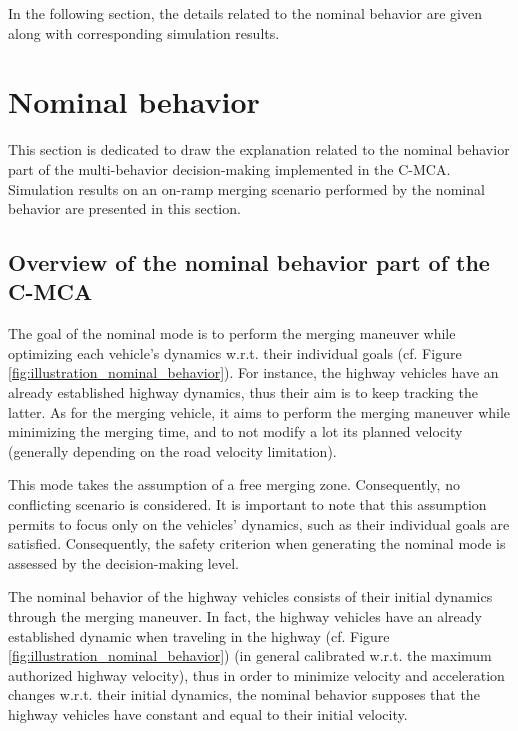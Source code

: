 In the following section, the details related to the nominal behavior are given along with corresponding simulation results. 

















\section{Nominal behavior} \label{sec:The_nominal_mode}

This section is dedicated to draw the explanation related to the nominal behavior part of the multi-behavior decision-making implemented in the C-MCA. Simulation results on an on-ramp merging scenario performed by the nominal behavior are presented in this section. 

\subsection{Overview of the nominal behavior part of the C-MCA}

The goal of the nominal mode is to perform the merging maneuver while optimizing each vehicle's dynamics w.r.t. their individual goals (cf. Figure \ref{fig:illustration_nominal_behavior}). For instance, the highway vehicles have an already established highway dynamics, thus their aim is to keep tracking the latter. As for the merging vehicle, it aims to perform the merging maneuver while minimizing the merging time, and to not modify a lot its planned velocity (generally depending on the road velocity limitation). 

This mode takes the assumption of a free merging zone. Consequently, no conflicting scenario is considered. It is important to note that this assumption permits to focus only on the vehicles' dynamics, such as their individual goals are satisfied. Consequently, the safety criterion when generating the nominal mode is assessed by the decision-making level. 


The nominal behavior of the highway vehicles consists of their initial dynamics through the merging maneuver. In fact, the highway vehicles have an already established dynamic when traveling in the highway (cf. Figure \ref{fig:illustration_nominal_behavior}) (in general calibrated w.r.t. the maximum authorized highway velocity), thus in order to minimize velocity and acceleration changes w.r.t. their initial dynamics, the nominal behavior supposes that the highway vehicles have constant and equal to their initial velocity. 


